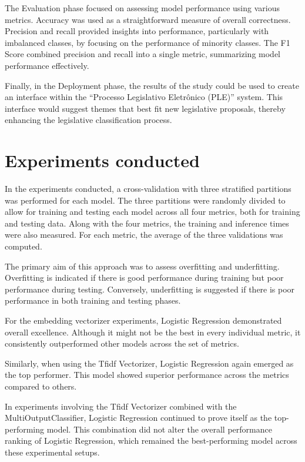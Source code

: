 \documentclass[12pt]{article}
\begin{document}
The Evaluation phase focused on assessing model performance using various metrics. Accuracy was used as a straightforward measure of overall correctness. Precision and recall provided insights into performance, particularly with imbalanced classes, by focusing on the performance of minority classes. The F1 Score combined precision and recall into a single metric, summarizing model performance effectively.

Finally, in the Deployment phase, the results of the study could be used to create an interface within the “Processo Legislativo Eletrônico (PLE)” system. This interface would suggest themes that best fit new legislative proposals, thereby enhancing the legislative classification process.

\section{Experiments conducted}

In the experiments conducted, a cross-validation with three stratified partitions was performed for each model. The three partitions were randomly divided to allow for training and testing each model across all four metrics, both for training and testing data. Along with the four metrics, the training and inference times were also measured. For each metric, the average of the three validations was computed.

The primary aim of this approach was to assess overfitting and underfitting. Overfitting is indicated if there is good performance during training but poor performance during testing. Conversely, underfitting is suggested if there is poor performance in both training and testing phases.

For the embedding vectorizer experiments, Logistic Regression demonstrated overall excellence. Although it might not be the best in every individual metric, it consistently outperformed other models across the set of metrics.

Similarly, when using the Tfidf Vectorizer, Logistic Regression again emerged as the top performer. This model showed superior performance across the metrics compared to others.

In experiments involving the Tfidf Vectorizer combined with the MultiOutputClassifier, Logistic Regression continued to prove itself as the top-performing model. This combination did not alter the overall performance ranking of Logistic Regression, which remained the best-performing model across these experimental setups.
\end{document}
